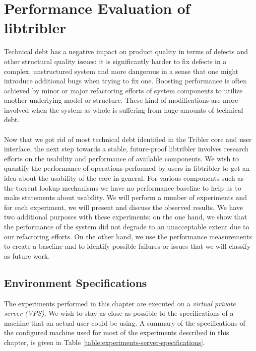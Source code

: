 \chapter{Performance Evaluation of libtribler}
\label{chapter:experiments}

Technical debt has a negative impact on product quality in terms of defects and other structural quality issues\cite{tom2013exploration}: it is significantly harder to fix defects in a complex, unstructured system and more dangerous in a sense that one might introduce additional bugs when trying to fix one. Boosting performance is often achieved by minor or major refactoring efforts of system components to utilize another underlying model or structure. These kind of modifications are more involved when the system as whole is suffering from huge amounts of technical debt.\\\\
Now that we got rid of most technical debt identified in the Tribler core and user interface, the next step towards a stable, future-proof libtribler involves research efforts on the usability and performance of available components. We wish to quantify the performance of operations performed by users in libtribler to get an idea about the usability of the core in general. For various components such as the torrent lookup mechanisms we have no performance baseline to help us to make statements about usability. We will perform a number of experiments and for each experiment, we will present and discuss the observed results. We have two additional purposes with these experiments: on the one hand, we show that the performance of the system did not degrade to an unacceptable extent due to our refactoring efforts. On the other hand, we use the performance measurements to create a baseline and to identify possible failures or issues that we will classify as future work.

\section{Environment Specifications}
\label{sec:environment-specifications}
The experiments performed in this chapter are executed on a \emph{virtual private server (VPS)}. We wish to stay as close as possible to the specifications of a machine that an actual user could be using. A summary of the specifications of the configured machine used for most of the experiments described in this chapter, is given in Table \ref{table:experiments-server-specifications}.

